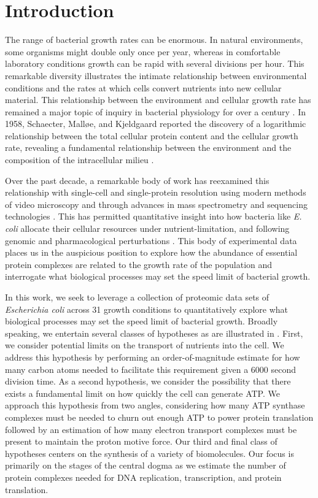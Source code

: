 

\section{Introduction}
The range of bacterial growth rates can be enormous. In natural environments,
some organisms might double only once per year, whereas in comfortable
laboratory conditions growth can be rapid with several divisions per hour. This
remarkable diversity illustrates the intimate relationship between environmental
conditions and the rates at which cells convert nutrients into new cellular
material. This relationship between the environment and cellular growth rate has
remained a major topic of inquiry in bacterial physiology for over a century
\citep{jun2018}. In 1958, Schaecter, Mall\o e, and Kjeldgaard reported the
discovery of a logarithmic relationship between the total cellular protein
content and the cellular growth rate, revealing a fundamental relationship
between the environment and the composition of the intracellular milieu
\citep{schaechter1958}.

Over the past decade, a remarkable body of work has reexamined this relationship
with single-cell and single-protein resolution using modern methods of video
microscopy \citep{si2017,harris2018} and through advances in mass spectrometry and
sequencing technologies \citep{schmidt2016,li2014}. This has permitted
quantitative insight into how bacteria like \textit{E. coli} allocate their
cellular resources under nutrient-limitation, and following genomic and
pharmacological perturbations \citep{scott2010,hui2015,basan2015}.
This body of experimental data places us in the auspicious position to
explore how the abundance of essential protein complexes are related to the
growth rate of the population and interrogate what biological processes may set
the speed limit of bacterial growth.

In this work, we seek to leverage a collection of proteomic data sets of
\textit{Escherichia coli} across 31 growth conditions \citep{valgepea2013,li2014,
peebo2015,hui2015,schmidt2016} to quantitatively explore what biological
processes may set the speed limit of bacterial growth. Broadly speaking, we
entertain several classes of hypotheses as are illustrated in .
First, we consider potential limits on the transport of nutrients into the cell.
We address this hypothesis by performing an order-of-magnitude estimate for how
many carbon atoms needed to facilitate this requirement given a 6000 second
division time.  As a second hypothesis, we consider the possibility that there
exists a fundamental limit on how quickly the cell can generate ATP. We approach
this hypothesis from two angles, considering how many ATP synthase complexes
must be needed to churn out enough ATP to power protein translation followed by
an estimation of how many electron transport complexes must be present to
maintain the proton motive force. Our third and final class of hypotheses
centers on the synthesis of a variety of biomolecules. Our focus is primarily on
the stages of the central dogma as we estimate the number of protein complexes
needed for DNA replication, transcription, and protein translation.

